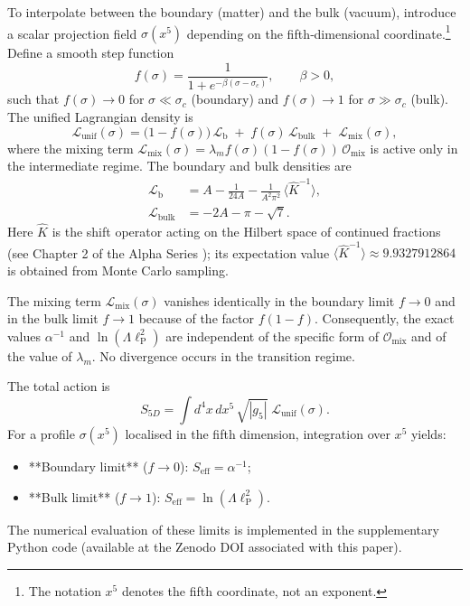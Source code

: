 \documentclass[12pt]{article}
\begin{document}
To interpolate between the boundary (matter) and the bulk (vacuum), introduce a scalar projection field \(\sigma(x^{5})\) depending on the fifth‑dimensional coordinate.\footnote{The notation \(x^{5}\) denotes the fifth coordinate, not an exponent.} Define a smooth step function
\begin{equation}\label{eq:f}
f(\sigma) = \frac{1}{1+e^{-\beta(\sigma-\sigma_c)}},\qquad \beta>0,
\end{equation}
such that \(f(\sigma)\to0\) for \(\sigma\ll\sigma_c\) (boundary) and \(f(\sigma)\to1\) for \(\sigma\gg\sigma_c\) (bulk). The unified Lagrangian density is
\begin{equation}\label{eq:Lunif}
\mathcal{L}_{\text{unif}}(\sigma) = \bigl(1-f(\sigma)\bigr)\,\mathcal{L}_{\text{b}} \;+\; f(\sigma)\,\mathcal{L}_{\text{bulk}} \;+\; \mathcal{L}_{\text{mix}}(\sigma),
\end{equation}
where the mixing term \(\mathcal{L}_{\text{mix}}(\sigma)=\lambda_{m}f(\sigma)(1-f(\sigma))\,\mathcal{O}_{\text{mix}}\) is active only in the intermediate regime. The boundary and bulk densities are
\begin{align}
\mathcal{L}_{\text{b}} &= A - \frac{1}{24A} - \frac{1}{A^{2}\pi^{2}}\,\langle\widehat{K}^{-1}\rangle,\label{eq:Lb}\\
\mathcal{L}_{\text{bulk}} &= -2A - \pi - \sqrt{7}.\label{eq:Lbulk}
\end{align}
Here \(\widehat{K}\) is the shift operator acting on the Hilbert space of continued fractions (see Chapter 2 of the Alpha Series \cite{alpha_series}); its expectation value \(\langle\widehat{K}^{-1}\rangle \approx 9.9327912864\) is obtained from Monte Carlo sampling.

The mixing term \(\mathcal{L}_{\text{mix}}(\sigma)\) vanishes identically in the boundary limit \(f\to0\) and in the bulk limit \(f\to1\) because of the factor \(f(1-f)\). Consequently, the exact values \(\alpha^{-1}\) and \(\ln(\Lambda \ell_{\text{P}}^2)\) are independent of the specific form of \(\mathcal{O}_{\text{mix}}\) and of the value of \(\lambda_m\). No divergence occurs in the transition regime.

The total action is
\begin{equation}\label{eq:S5D}
S_{5D} = \int d^{4}x\,dx^{5}\,\sqrt{|g_{5}|}\; \mathcal{L}_{\text{unif}}(\sigma).
\end{equation}
For a profile \(\sigma(x^{5})\) localised in the fifth dimension, integration over \(x^{5}\) yields:
\begin{itemize}
  \item **Boundary limit** (\(f\to0\)): \(S_{\text{eff}} = \alpha^{-1}\);
  \item **Bulk limit** (\(f\to1\)): \(S_{\text{eff}} = \ln(\Lambda \ell_{\text{P}}^2)\).
\end{itemize}
The numerical evaluation of these limits is implemented in the supplementary Python code (available at the Zenodo DOI associated with this paper).
\end{document}
